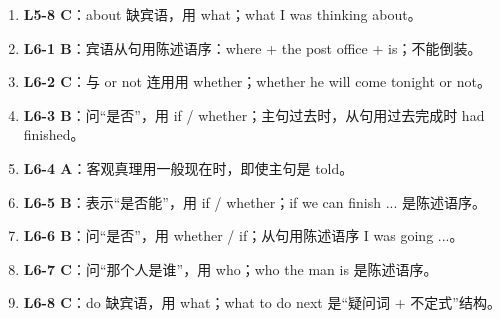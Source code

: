 \documentclass[11pt,a4paper]{ctexart}
\begin{document}
\begin{enumerate}[leftmargin=1.6em,itemsep=2pt]
\item \textbf{L5-8 C}：about 缺宾语，用 what；what I was thinking about。
\item \textbf{L6-1 B}：宾语从句用陈述语序：where + the post office + is；不能倒装。
\item \textbf{L6-2 C}：与 or not 连用用 whether；whether he will come tonight or not。
\item \textbf{L6-3 B}：问“是否”，用 if / whether；主句过去时，从句用过去完成时 had finished。
\item \textbf{L6-4 A}：客观真理用一般现在时，即使主句是 told。
\item \textbf{L6-5 B}：表示“是否能”，用 if / whether；if we can finish ... 是陈述语序。
\item \textbf{L6-6 B}：问“是否”，用 whether / if；从句用陈述语序 I was going ...。
\item \textbf{L6-7 C}：问“那个人是谁”，用 who；who the man is 是陈述语序。
\item \textbf{L6-8 C}：do 缺宾语，用 what；what to do next 是“疑问词 + 不定式”结构。
\end{enumerate}
\end{document}
